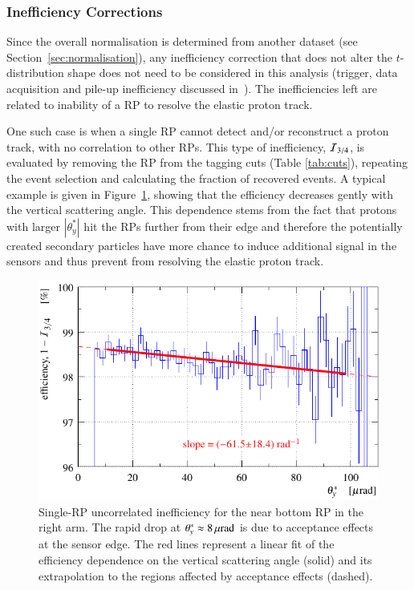 
\subsubsection{Inefficiency Corrections}
\label{sec:ineff corr}

Since the overall normalisation is determined from another dataset (see Section~\ref{sec:normalisation}), any inefficiency correction that does not alter the $t$-distribution shape does not need to be considered in this analysis (trigger, data acquisition and pile-up inefficiency discussed in~\cite{epl101-el,prl111}). The inefficiencies left are related to inability of a RP to resolve the elastic proton track.

One such case is when a single RP cannot detect and/or reconstruct a proton track, with no correlation to other RPs. This type of inefficiency, ${\cal I}_{3/4}$, is evaluated by removing the RP from the tagging cuts (Table \ref{tab:cuts}), repeating the event selection and calculating the fraction of recovered events. A typical example is given in Figure~\ref{fig:eff 3/4}, showing that the efficiency decreases gently with the vertical scattering angle. This dependence stems from the fact that protons with larger $|\theta_y^*|$ hit the RPs further from their edge and therefore the potentially created secondary particles have more chance to induce additional signal in the sensors and thus prevent from resolving the elastic proton track.

\begin{figure}
\begin{center}
\includegraphics{fig/eff3outof4_fits.pdf}
\caption{%
Single-RP uncorrelated inefficiency for the near bottom RP in the right arm. The rapid drop at $\theta_y^* \approx 8\,{\rm \mu rad}$ is due to acceptance effects at the sensor edge. The red lines represent a linear fit of the efficiency dependence on the vertical scattering angle (solid) and its extrapolation to the regions affected by acceptance effects (dashed).
}
\label{fig:eff 3/4}
\end{center}
\end{figure}

